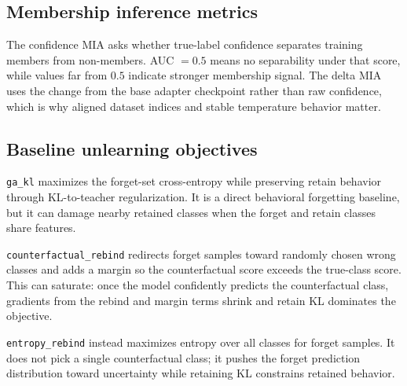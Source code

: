 \documentclass[10pt,a4paper]{article}
\begin{document}
\subsection{Membership inference metrics}
The confidence MIA asks whether true-label confidence separates training members from non-members. AUC \(=0.5\) means no separability under that score, while values far from \(0.5\) indicate stronger membership signal. The delta MIA uses the change from the base adapter checkpoint rather than raw confidence, which is why aligned dataset indices and stable temperature behavior matter.

\subsection{Baseline unlearning objectives}
\texttt{ga\_kl} maximizes the forget-set cross-entropy while preserving retain behavior through KL-to-teacher regularization. It is a direct behavioral forgetting baseline, but it can damage nearby retained classes when the forget and retain classes share features.

\texttt{counterfactual\_rebind} redirects forget samples toward randomly chosen wrong classes and adds a margin so the counterfactual score exceeds the true-class score. This can saturate: once the model confidently predicts the counterfactual class, gradients from the rebind and margin terms shrink and retain KL dominates the objective.

\texttt{entropy\_rebind} instead maximizes entropy over all classes for forget samples. It does not pick a single counterfactual class; it pushes the forget prediction distribution toward uncertainty while retaining KL constrains retained behavior.
\end{document}
